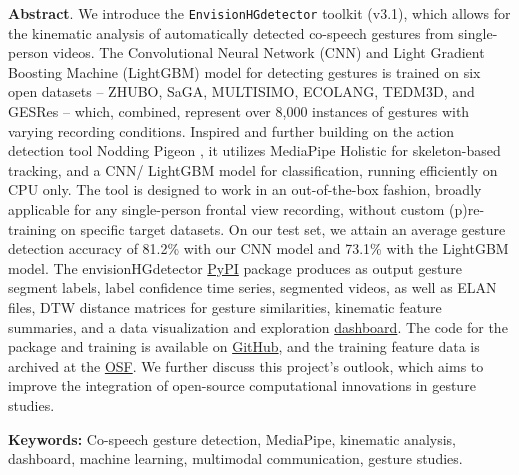 \documentclass[11pt,smallheadings,cleardoublepage=empty,tocflat,numbers=noenddot,twoside,captions=tableheading]{scrbook}
\begin{document}
\begin{refsection}
\textbf{Abstract}. We introduce the \texttt{EnvisionHGdetector} toolkit (v3.1), which allows for the kinematic analysis of automatically detected co-speech gestures from single-person videos. The Convolutional Neural Network (CNN) and Light Gradient Boosting Machine (LightGBM) model for detecting gestures is trained on six open datasets -- ZHUBO, SaGA, MULTISIMO, ECOLANG, TEDM3D, and GESRes -- which, combined, represent over {\color{red}8,000} instances of gestures with varying recording conditions. Inspired and further building on the action detection tool Nodding Pigeon \parencite{yungNoddingPigeonHttps2022}, it utilizes MediaPipe Holistic for skeleton-based tracking, and a CNN/ LightGBM model for classification, running efficiently on CPU only. The tool is designed to work in an out-of-the-box fashion, broadly applicable for any single-person frontal view recording, without custom (p)re-training on specific target datasets. On our test set, we attain an average gesture detection accuracy of 81.2\% with our CNN model and 73.1\% with the LightGBM model. The envisionHGdetector \href{https://pypi.org/project/envisionhgdetector/}{PyPI} package produces as output gesture segment labels, label confidence time series, segmented videos, as well as ELAN files, DTW distance matrices for gesture similarities, kinematic feature summaries, and a data visualization and exploration \href{https://tsg-131-174-75-200.hosting.ru.nl/envisionhgdetectordashboard/}{dashboard}. The code for the package and training is available on \href{https://github.com/WimPouw/envisionhgdetector}{GitHub}, and the training feature data is archived at the \href{https://osf.io/qgecj/}{OSF}. We further discuss this project's outlook, which aims to improve the integration of open-source computational innovations in gesture studies.

\textbf{Keywords:} Co-speech gesture detection, MediaPipe, kinematic analysis, dashboard, machine learning, multimodal communication, gesture studies.


\end{refsection}
\end{document}

